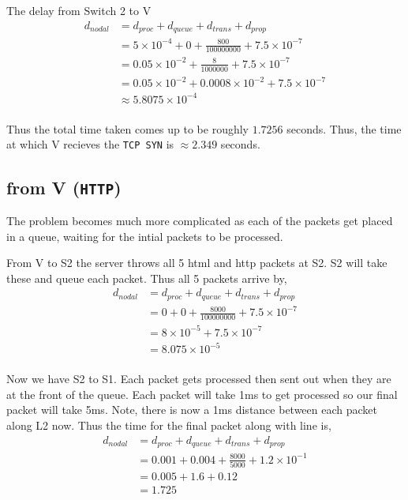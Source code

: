 \documentclass{article}
\begin{document}
The delay from Switch 2 to V
\begin{align*}
    d_{nodal} &= d_{proc} + d_{queue} + d_{trans} + d_{prop} \\
    &= 5 \times 10^{-4} + 0 + \frac{800}{100000000} + 7.5 \times 10^{-7} \\
    &= 0.05 \times 10^{-2} + \frac{8}{1000000} + 7.5 \times 10^{-7} \\
    &= 0.05 \times 10^{-2} + 0.0008 \times 10^{-2} + 7.5 \times 10^{-7} \\
    &\approx 5.8075 \times 10^{-4} \\
\end{align*}

Thus the total time taken comes up to be roughly $1.7256$ seconds.
Thus, the time at which V recieves the \texttt{TCP SYN} is
$\approx 2.349$ seconds.

\subsection{from V (\texttt{HTTP})}
The problem becomes much more complicated as each of the packets get placed in
a queue, waiting for the intial packets to be processed.

From V to S2 the server throws all 5 html and http packets at S2. S2 will take
these and queue each packet. Thus all 5 packets arrive by,
\begin{align*}
    d_{nodal} &= d_{proc} + d_{queue} + d_{trans} + d_{prop} \\
    &= 0 + 0 + \frac{8000}{100000000} + 7.5 \times 10^{-7} \\
    &= 8 \times 10^{-5} + 7.5 \times 10^{-7} \\
    &= 8.075 \times 10^{-5} \\
\end{align*}

Now we have S2 to S1. Each packet gets processed then sent out when they are
at the front of the queue.
Each packet will take 1ms to get processed so our final packet
will take 5ms. Note, there is now a 1ms distance between each packet along
L2 now. Thus the time for the final packet along with line is,
\begin{align*}
    d_{nodal} &= d_{proc} + d_{queue} + d_{trans} + d_{prop} \\
    &= 0.001 + 0.004 + \frac{8000}{5000} + 1.2 \times 10^{-1} \\
    &= 0.005 + 1.6 + 0.12 \\
    &= 1.725 \\
\end{align*}
\end{document}
